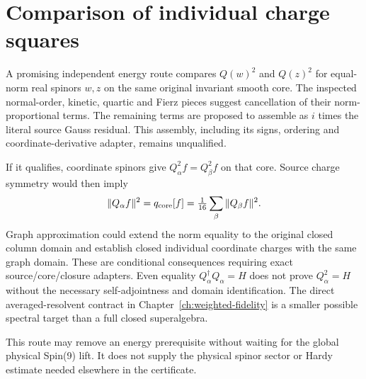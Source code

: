 \section{Comparison of individual charge squares}
\label{sec:ed08-square-difference}
A promising independent energy route compares $Q(w)^2$ and $Q(z)^2$
for equal-norm real spinors $w,z$ on the same original invariant
smooth core. The inspected normal-order, kinetic, quartic and
Fierz pieces suggest cancellation of their norm-proportional terms.
The remaining terms are proposed to assemble as $i$ times the
literal source Gauss residual. This assembly, including its
signs, ordering and coordinate-derivative adapter, remains unqualified.

If it qualifies, coordinate spinors give $Q_\alpha^2f=Q_\beta^2f$
on that core. Source charge symmetry would then imply
\begin{equation}\label{eq:ed08-equal-charge}
 \|Q_\alpha f\|^2=q_{\rm core}[f]
 =\tfrac1{16}\sum_\beta\|Q_\beta f\|^2.
\end{equation}
Graph approximation could extend the norm equality to the original
closed column domain and establish closed individual coordinate
charges with the same graph domain. These are conditional
consequences requiring exact source/core/closure adapters.
Even equality $Q_\alpha^\dagger Q_\alpha=H$ does not prove
$Q_\alpha^2=H$ without the necessary self-adjointness and domain
identification. The direct averaged-resolvent contract in Chapter~\ref{ch:weighted-fidelity}
is a smaller possible spectral target than a full closed superalgebra.

This route may remove an energy prerequisite without waiting for the
global physical Spin(9) lift. It does not supply the physical spinor
sector or Hardy estimate needed elsewhere in the certificate.
